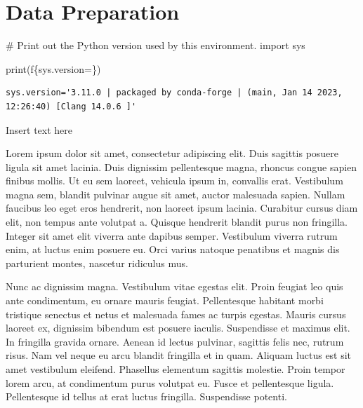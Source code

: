 \documentclass[
  letterpaper,
  DIV=11,
  numbers=noendperiod]{scrreprt}
\newenvironment{Shaded}{\begin{snugshade}}{\end{snugshade}}
\newcommand{\BuiltInTok}[1]{\textcolor[rgb]{0.00,0.23,0.31}{#1}}
\newcommand{\CommentTok}[1]{\textcolor[rgb]{0.37,0.37,0.37}{#1}}
\newcommand{\ImportTok}[1]{\textcolor[rgb]{0.00,0.46,0.62}{#1}}
\newcommand{\NormalTok}[1]{\textcolor[rgb]{0.00,0.23,0.31}{#1}}
\newcommand{\OperatorTok}[1]{\textcolor[rgb]{0.37,0.37,0.37}{#1}}
\newcommand{\SpecialCharTok}[1]{\textcolor[rgb]{0.37,0.37,0.37}{#1}}
\newcommand{\SpecialStringTok}[1]{\textcolor[rgb]{0.13,0.47,0.30}{#1}}
\begin{document}

\chapter{Data Preparation}\label{data-preparation}

\begin{Shaded}
\begin{Highlighting}[]
\CommentTok{\# Print out the Python version used by this environment.}
\ImportTok{import}\NormalTok{ sys}

\BuiltInTok{print}\NormalTok{(}\SpecialStringTok{f\textquotesingle{}}\SpecialCharTok{\{}\NormalTok{sys}\SpecialCharTok{.}\NormalTok{version}\OperatorTok{=}\SpecialCharTok{\}}\SpecialStringTok{\textquotesingle{}}\NormalTok{)}
\end{Highlighting}
\end{Shaded}

\begin{verbatim}
sys.version='3.11.0 | packaged by conda-forge | (main, Jan 14 2023, 12:26:40) [Clang 14.0.6 ]'
\end{verbatim}

Insert text here

Lorem ipsum dolor sit amet, consectetur adipiscing elit. Duis sagittis
posuere ligula sit amet lacinia. Duis dignissim pellentesque magna,
rhoncus congue sapien finibus mollis. Ut eu sem laoreet, vehicula ipsum
in, convallis erat. Vestibulum magna sem, blandit pulvinar augue sit
amet, auctor malesuada sapien. Nullam faucibus leo eget eros hendrerit,
non laoreet ipsum lacinia. Curabitur cursus diam elit, non tempus ante
volutpat a. Quisque hendrerit blandit purus non fringilla. Integer sit
amet elit viverra ante dapibus semper. Vestibulum viverra rutrum enim,
at luctus enim posuere eu. Orci varius natoque penatibus et magnis dis
parturient montes, nascetur ridiculus mus.

Nunc ac dignissim magna. Vestibulum vitae egestas elit. Proin feugiat
leo quis ante condimentum, eu ornare mauris feugiat. Pellentesque
habitant morbi tristique senectus et netus et malesuada fames ac turpis
egestas. Mauris cursus laoreet ex, dignissim bibendum est posuere
iaculis. Suspendisse et maximus elit. In fringilla gravida ornare.
Aenean id lectus pulvinar, sagittis felis nec, rutrum risus. Nam vel
neque eu arcu blandit fringilla et in quam. Aliquam luctus est sit amet
vestibulum eleifend. Phasellus elementum sagittis molestie. Proin tempor
lorem arcu, at condimentum purus volutpat eu. Fusce et pellentesque
ligula. Pellentesque id tellus at erat luctus fringilla. Suspendisse
potenti.
\end{document}
